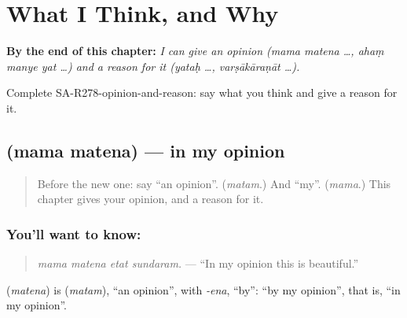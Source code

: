
\chapter{What I Think, and Why}
\label{ch:sa-what-i-think-and-why}

\begin{chapteropening}
\textbf{By the end of this chapter:} \emph{I can give an opinion (mama matena …, ahaṃ manye yat …) and a reason for it (yataḥ …, varṣākāraṇāt …).}

Complete SA-R278-opinion-and-reason: say what you think and give a reason for it.
\end{chapteropening}

\section[\texorpdfstring{\sk{मम} \sk{मतेन} (mama matena)}{मम मतेन (mama matena)}]{  (mama matena) — in my opinion}

\label{lesson:SA-C278-mama-matena}



\begin{quote}
Before the new one: say \textquotedblleft{}an opinion\textquotedblright{}. (\emph{matam}.) And \textquotedblleft{}my\textquotedblright{}. (\emph{mama}.) This chapter gives your opinion, and a reason for it.
\end{quote}

\subsection*{You'll want to know:  }
\begin{quote}
\textbf{   }
\end{quote}

\begin{quote}
\emph{mama matena etat sundaram.} — \textquotedblleft{}In my opinion this is beautiful.\textquotedblright{}
\end{quote}

\textbf{} (\emph{matena}) is \textbf{} (\emph{matam}), \textquotedblleft{}an opinion\textquotedblright{}, with \emph{-ena}, \textquotedblleft{}by\textquotedblright{}: \textquotedblleft{}by my opinion\textquotedblright{}, that is, \textquotedblleft{}in my opinion\textquotedblright{}.

